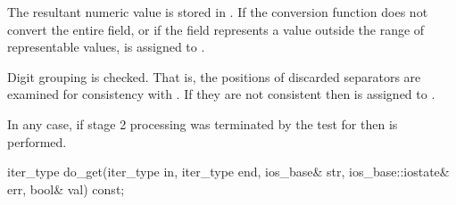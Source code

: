\begin{itemdescr}
\begin{description}
The resultant numeric value is stored in .
If the conversion function does not convert the entire field, or
if the field represents a value outside the range of representable values,
 is assigned to .

\end{description}

\pnum
Digit grouping is checked.
That is, the positions of discarded
separators are examined for consistency with
.
If they are not consistent
then  is assigned to .

\pnum
In any case,
if stage 2 processing was terminated by the test for 
then  is performed.
\end{itemdescr}

%
\begin{itemdecl}
iter_type do_get(iter_type in, iter_type end, ios_base& str,
                 ios_base::iostate& err, bool& val) const;
\end{itemdecl}

